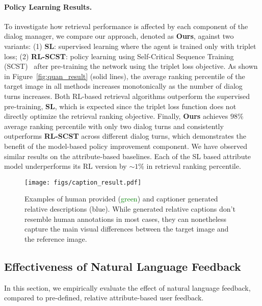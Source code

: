 \paragraph{Policy Learning Results.} 
To investigate how retrieval performance is affected by each component 
of the dialog manager, we compare our approach, denoted as \textbf{Ours}, against 
two variants: (1) \textbf{SL}: supervised learning where the agent is trained only with triplet loss; 
(2) \textbf{RL-SCST}: policy learning using Self-Critical Sequence Training (SCST)~\cite{rennie2016self} after pre-training the network using the triplet loss objective. 
As shown in Figure~\ref{fig:quan_result} (solid lines), the average ranking percentile 
of the target image in all methods increases monotonically as the 
number of dialog turns increases. Both RL-based retrieval algorithms 
outperform the supervised pre-training, \textbf{SL}, which is 
expected since the triplet loss function does not directly optimize the retrieval
ranking objective. Finally, \textbf{Ours} achieves $98\%$ average ranking percentile 
with only two dialog turns and consistently outperforms \textbf{RL-SCST} 
across different dialog turns, which demonstrates the benefit of the model-based
policy improvement component. We have observed similar results on the attribute-based baselines. Each of the SL based attribute model underperforms its RL version by
 $\sim1\%$ in retrieval ranking percentile.


\begin{figure*}
\centering
\texttt{[image: figs/caption\_result.pdf]} 
\caption{Examples of human provided (\textcolor{Green}{green}) and captioner generated relative descriptions 
(\textcolor{NavyBlue}{blue}). 
While generated relative captions don't resemble human annotations in 
most cases, they can nonetheless capture the main visual differences between the
target image and the reference image.}
\label{fig:captioner}
\end{figure*}

\subsection{Effectiveness of Natural Language Feedback}
\label{sec:dialogResult}


In this section, we empirically evaluate the effect of natural language feedback, compared
to pre-defined, relative attribute-based user feedback. 

